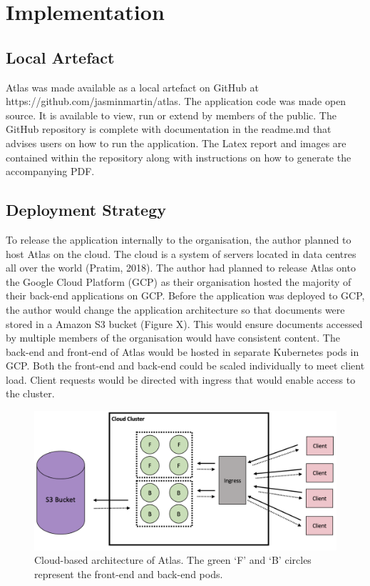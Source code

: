 \documentclass{article}
\begin{document}
\newpage

\section{Implementation}

\subsection{Local Artefact}
Atlas was made available as a local artefact on GitHub at https://github.com/jasminmartin/atlas. The application code was made open source. It is available to view, run or extend by members of the public. The GitHub repository is complete with documentation in the readme.md that advises users on how to run the application. The Latex report and images are contained within the repository along with instructions on how to generate the accompanying PDF.

\subsection{Deployment Strategy}
To release the application internally to the organisation, the author planned to host Atlas on the cloud. The cloud is a system of servers located in data centres all over the world (Pratim, 2018). The author had planned to release Atlas onto the Google Cloud Platform (GCP) as their organisation hosted the majority of their back-end applications on GCP. Before the application was deployed to GCP, the author would change the application architecture so that documents were stored in a Amazon S3 bucket (Figure X). This would ensure documents accessed by multiple members of the organisation would have consistent content. The back-end and front-end of Atlas would be hosted in separate Kubernetes pods in GCP. Both the front-end and back-end could be scaled individually to meet client load. Client requests would be directed with ingress that would enable access to the cluster.

\begin{figure}[!htb]
  \centering
      \includegraphics[width=1\textwidth]{images/deployment.png}
  \caption{Cloud-based architecture of Atlas. The green ‘F’ and ‘B’ circles represent the front-end and back-end pods.}
\end{figure}
\end{document}
